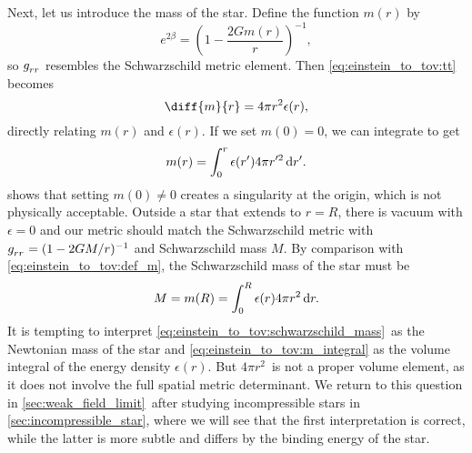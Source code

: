 Next, let us introduce the mass of the star.
Define the function $m(r)$ by
\begin{equation}
	e^{2 \beta} = \left( 1 - \frac{2 G m(r)}{r} \right)^{-1} ,
	\label{eq:einstein_to_tov:def_m}
\end{equation}
so $g\indices{_r_r}$ resembles the Schwarzschild metric element.
Then \cref{eq:einstein_to_tov:tt} becomes
\begin{equation}
	\diff{m}{r} = 4 \pi r^2 \epsilon(r) ,
	\label{eq:einstein_to_tov:m_rho}
\end{equation}
directly relating $m(r)$ and $\epsilon(r)$.
If we set $m(0) = 0$, we can integrate to get
\begin{equation}
	m(r) = \integral{\epsilon(r') 4 \pi r'^2}{r'}{0}{r} .
	\label{eq:einstein_to_tov:m_integral}
\end{equation}
\cite[page 602]{ref:mtw} shows that setting $m(0) \neq 0$ creates a singularity at the origin, which is not physically acceptable.
Outside a star that extends to $r = R$, there is vacuum with $\epsilon = 0$ and our metric should match the Schwarzschild metric with $g\indices{_r_r} = (1-2GM/r)^{-1}$ and Schwarzschild mass $M$.
By comparison with \cref{eq:einstein_to_tov:def_m}, the Schwarzschild mass of the star must be
\begin{equation}
	M = m(R) = \integral{\epsilon(r) 4 \pi r^2}{r}{0}{R} .
	\label{eq:einstein_to_tov:schwarzschild_mass}
\end{equation}
It is tempting to interpret \eqref{eq:einstein_to_tov:schwarzschild_mass} as the Newtonian mass of the star and \eqref{eq:einstein_to_tov:m_integral} as the volume integral of the energy density $\epsilon(r)$.
But $4 \pi r^2$ is not a proper volume element, as it does not involve the full spatial metric determinant.
We return to this question in \cref{sec:weak_field_limit} after studying incompressible stars in \cref{sec:incompressible_star}, where we will see that the first interpretation is correct, while the latter is more subtle and differs by the binding energy of the star.

